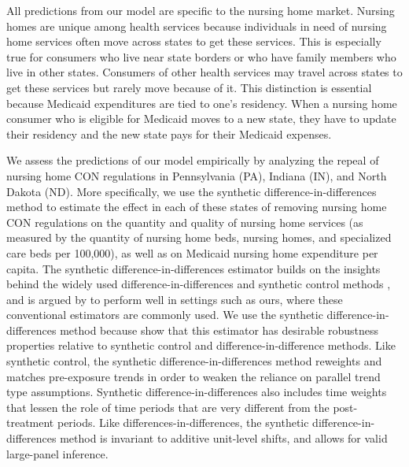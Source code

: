 \documentclass[../Main.tex]{subfiles}
\begin{document}
All predictions from our model are specific to the nursing home market. Nursing homes are unique among health services because individuals in need of nursing home services often move across states to get these services. This is especially true for consumers who live near state borders or who have family members who live in other states. Consumers of other health services may travel across states to get these services but rarely move because of it. This distinction is essential because Medicaid expenditures are tied to one's residency. When a nursing home consumer who is eligible for Medicaid moves to a new state, they have to update their residency and the new state pays for their Medicaid expenses.  

We assess the predictions of our model empirically by analyzing the repeal of nursing home CON regulations in Pennsylvania (PA), Indiana (IN), and North Dakota (ND). More specifically, we use the synthetic difference-in-differences method \citep{arkhangelsky2021synthetic} to estimate the effect in each of these states of removing nursing home CON regulations on the quantity and quality of nursing home services (as measured by the quantity of nursing home beds, nursing homes, and specialized care beds per 100,000), as well as on Medicaid nursing home expenditure per capita. The synthetic difference-in-differences estimator builds on the insights behind the widely used difference-in-differences and synthetic control methods \citep{abadie2003economic,abadie2010synthetic,currie2020technology}, and is argued by \citet{arkhangelsky2021synthetic} to perform well in settings such as ours, where these conventional estimators are commonly used. We use the synthetic difference-in-differences method because \citet{arkhangelsky2021synthetic} show that this estimator has desirable robustness properties relative to synthetic control and difference-in-difference methods. Like synthetic control, the synthetic difference-in-differences method reweights and matches pre-exposure trends in order to weaken the reliance on parallel trend type assumptions. Synthetic difference-in-differences also includes time weights that lessen the role of time periods that are very different from the post-treatment periods. Like differences-in-differences, the synthetic difference-in-differences method is invariant to additive unit-level shifts, and allows for valid large-panel inference.
\end{document}
